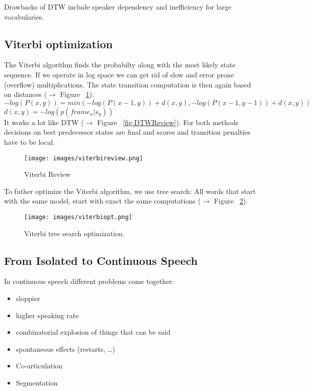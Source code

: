 Drawbacks of DTW include speaker dependency and inefficiency for large vocabularies.

\subsection{Viterbi optimization}

The Viterbi algorithm finds the probabilty along with the most likely state sequence. If we operate in log space we can get rid of slow and error prone (overflow) multiplications. The state transition computation is then again based on distances ($\to$ Figure ~\ref{fig:ViterbiReview}): \\

$-log(P(x,y)) = min(-log(P(x-1, y)) + d(x,y),-log(P(x-1, y-1)) + d(x,y))$ \\ 
$d(x,y) = -log(p(frame_x|s_y))$  \\

It works a lot like DTW ($\to$ Figure ~\ref{fig:DTWReview}). For both methods decisions on best predecessor states are final and scores and transition penalties have to be local.

\begin{figure}[htb]
\centering
\texttt{[image: images/viterbireview.png]}
\caption{\label{fig:ViterbiReview} Viterbi Review}
\end{figure}

To futher optimize the Viterbi algorithm, we use tree search: All words that start with the same model, start with exact the same computations ($\to$ Figure ~\ref{fig:viterbiTreeSearchOptimization}).
\begin{figure}[htb]
\centering
\texttt{[image: images/viterbiopt.png]}
\caption{\label{fig:viterbiTreeSearchOptimization} Viterbi tree search optimization.}
\end{figure}

\subsection{From Isolated to Continuous Speech}

In continuous speech different problems come together:
\begin{itemize}
\item sloppier
\item higher speaking rate
\item combinatorial explosion of things that can be said
\item spontaneous effects (restarts, \dots)
\item Co-articulation
\item Segmentation
\end{itemize}

